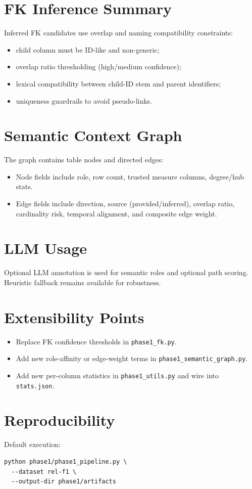 \documentclass[11pt]{article}
\begin{document}
\section{FK Inference Summary}
Inferred FK candidates use overlap and naming compatibility constraints:
\begin{itemize}[leftmargin=1.5em]
  \item child column must be ID-like and non-generic;
  \item overlap ratio thresholding (high/medium confidence);
  \item lexical compatibility between child-ID stem and parent identifiers;
  \item uniqueness guardrails to avoid pseudo-links.
\end{itemize}

\section{Semantic Context Graph}
The graph contains table nodes and directed edges:
\begin{itemize}[leftmargin=1.5em]
  \item Node fields include role, row count, trusted measure columns, degree/hub stats.
  \item Edge fields include direction, source (provided/inferred), overlap ratio,
  cardinality risk, temporal alignment, and composite edge weight.
\end{itemize}

\section{LLM Usage}
Optional LLM annotation is used for semantic roles and optional path scoring. Heuristic fallback remains available for robustness.

\section{Extensibility Points}
\begin{itemize}[leftmargin=1.5em]
  \item Replace FK confidence thresholds in \texttt{phase1\_fk.py}.
  \item Add new role-affinity or edge-weight terms in \texttt{phase1\_semantic\_graph.py}.
  \item Add new per-column statistics in \texttt{phase1\_utils.py} and wire into \texttt{stats.json}.
\end{itemize}

\section{Reproducibility}
Default execution:
\begin{verbatim}
python phase1/phase1_pipeline.py \
  --dataset rel-f1 \
  --output-dir phase1/artifacts
\end{verbatim}
\end{document}
